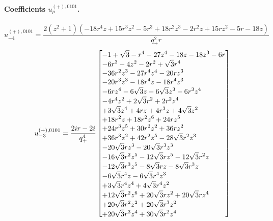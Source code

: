 \documentclass[11pt,a4paper]{article}
\begin{document}
\paragraph{Coefficients $u_p^{(+),0101}$.}
\begin{equation}
u_{-4}^{(+),0101}=\frac{2 \left(z^{2} + 1\right) \left(- 18 r^{4} z + 15 r^{3} z^{2} - 5 r^{3} + 18 r^{2} z^{3} - 2 r^{2} z + 15 r z^{2} - 5 r - 18 z\right)}{q_{+}^{2} r}
\label{eq:cat-auxiliary-plus-0101-m4}
\end{equation}
\begin{equation}
u_{-3}^{(+),0101}=\frac{2 i r - 2 i}{q_{+}^{4}}\left[\vcenter{\hbox{\shortstack[l]{$\displaystyle  - 1 + \sqrt{3} - r^{4} - 27 z^{4} - 18 z - 18 z^{3} - 6 r$\\
$\displaystyle  - 6 r^{3} - 4 z^{2} - 2 r^{2} + \sqrt{3} r^{4}$\\
$\displaystyle  - 36 r^{2} z^{3} - 27 r^{4} z^{4} - 20 r z^{3}$\\
$\displaystyle  - 20 r^{3} z^{3} - 18 r^{4} z - 18 r^{4} z^{3}$\\
$\displaystyle  - 6 r z^{4} - 6 \sqrt{3} z - 6 \sqrt{3} z^{3} - 6 r^{3} z^{4}$\\
$\displaystyle  - 4 r^{4} z^{2} + 2 \sqrt{3} r^{2} + 2 r^{2} z^{4}$\\
$\displaystyle  + 3 \sqrt{3} z^{4} + 4 r z + 4 r^{3} z + 4 \sqrt{3} z^{2}$\\
$\displaystyle  + 18 r^{2} z + 18 r^{2} z^{6} + 24 r z^{5}$\\
$\displaystyle  + 24 r^{3} z^{5} + 30 r^{2} z^{2} + 36 r z^{2}$\\
$\displaystyle  + 36 r^{3} z^{2} + 42 r^{2} z^{5} - 28 \sqrt{3} r^{2} z^{3}$\\
$\displaystyle  - 20 \sqrt{3} r z^{3} - 20 \sqrt{3} r^{3} z^{3}$\\
$\displaystyle  - 16 \sqrt{3} r^{2} z^{5} - 12 \sqrt{3} r z^{5} - 12 \sqrt{3} r^{2} z$\\
$\displaystyle  - 12 \sqrt{3} r^{3} z^{5} - 8 \sqrt{3} r z - 8 \sqrt{3} r^{3} z$\\
$\displaystyle  - 6 \sqrt{3} r^{4} z - 6 \sqrt{3} r^{4} z^{3}$\\
$\displaystyle  + 3 \sqrt{3} r^{4} z^{4} + 4 \sqrt{3} r^{4} z^{2}$\\
$\displaystyle  + 12 \sqrt{3} r^{2} z^{6} + 20 \sqrt{3} r z^{2} + 20 \sqrt{3} r z^{4}$\\
$\displaystyle  + 20 \sqrt{3} r^{2} z^{2} + 20 \sqrt{3} r^{3} z^{2}$\\
$\displaystyle  + 20 \sqrt{3} r^{3} z^{4} + 30 \sqrt{3} r^{2} z^{4}$}}}\right]
\label{eq:cat-auxiliary-plus-0101-m3}
\end{equation}
\end{document}

